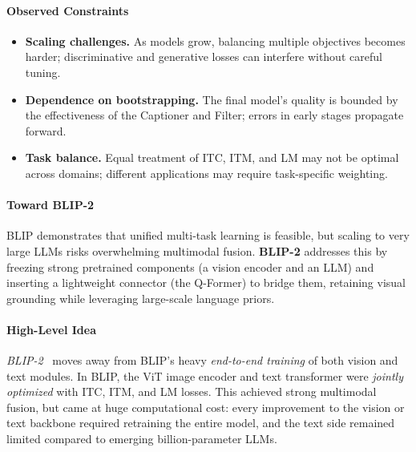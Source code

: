 \begin{enrichment}
\begin{enrichment}
        \paragraph{Observed Constraints}
        \begin{itemize}
            \item \textbf{Scaling challenges.} As models grow, balancing multiple objectives becomes harder; discriminative and generative losses can interfere without careful tuning.
            \item \textbf{Dependence on bootstrapping.} The final model’s quality is bounded by the effectiveness of the Captioner and Filter; errors in early stages propagate forward.
            \item \textbf{Task balance.} Equal treatment of ITC, ITM, and LM may not be optimal across domains; different applications may require task-specific weighting.
        \end{itemize}
        
        \paragraph{Toward BLIP-2}  
        BLIP demonstrates that unified multi-task learning is feasible, but scaling to very large LLMs risks overwhelming multimodal fusion. \textbf{BLIP-2} addresses this by freezing strong pretrained components (a vision encoder and an LLM) and inserting a lightweight connector (the Q-Former) to bridge them, retaining visual grounding while leveraging large-scale language priors.
        
    \end{enrichment}
    
    \newpage
    
    \begin{enrichment}
        \label{enr:subsec_chapter24_blip2}
        
        \paragraph{High-Level Idea} 
        \emph{BLIP-2}~\cite{li2023_blip2} moves away from BLIP’s heavy \emph{end-to-end training} of both vision and text modules. In BLIP, the ViT image encoder and text transformer were \emph{jointly optimized} with ITC, ITM, and LM losses. This achieved strong multimodal fusion, but came at huge computational cost: every improvement to the vision or text backbone required retraining the entire model, and the text side remained limited compared to emerging billion-parameter LLMs.
        

\end{enrichment}
\end{enrichment}
